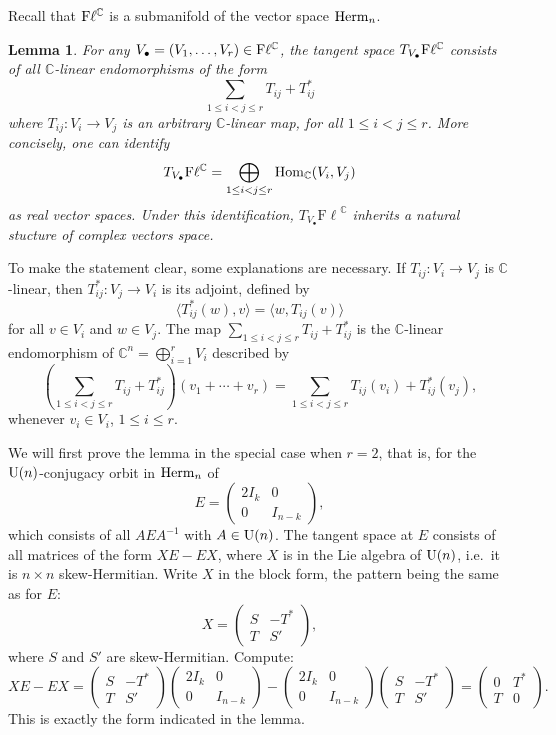 \documentclass[12pt]{amsart}
\newtheorem{lem}[thm]{Lemma}
\theoremstyle{definition}
\theoremstyle{remark}
\newcommand{\CC}{\mathbb C}
\newcommand{\Fl}{{\mathrm{F\ell}}}
\begin{document}
Recall that ${\rm F}\ell^\CC$ is a submanifold of the  vector space ${\rm Herm}_n$. 
\begin{lem} \label{tangsp} For any $V_{\bullet}= (V_1, \ldots, V_r)\in {\rm F}\ell^\CC$, the tangent space  $T_{V_{\bullet}}{\rm F}\ell^\CC$ consists of all $\CC$-linear endomorphisms of the form
$$\sum_{1\le i <j \le r} T_{ij}+T_{ij}^*$$
where $T_{ij} : V_i \to V_j$ is an arbitrary $\CC$-linear map, for all $1\le i < j \le r$.  More concisely, one can identify 
\begin{equation}\label{eq:tangent}T_{V_\bullet} {\rm F}\ell^\CC =\bigoplus_{1\le i < j \le r} {\rm Hom}_\CC (V_i, V_j)\end{equation}
as real vector spaces. Under this identification, $T_{V_\bullet}\Fl^\CC$ inherits a natural stucture of complex vectors space. 
\end{lem}
To make the statement clear, some explanations are necessary. If $T_{ij} : V_i \to V_j$ is
$\CC$-linear, then $T_{ij}^*: V_j \to V_i$ is its adjoint, defined by
$$\langle T_{ij}^*(w), v\rangle = \langle w, T_{ij}(v)\rangle $$
for all $v\in V_i$ and $w\in V_j$. The map 
$\sum_{1\le i <j \le r} T_{ij}+T_{ij}^*$ is the $\CC$-linear endomorphism of $\CC^n=\bigoplus_{i=1}^r V_i$ described by
$$\left(\sum_{1\le i <j \le r} T_{ij}+T_{ij}^*\right)(v_1+ \cdots + v_r) =\sum_{1\le i <j \le r}
T_{ij}(v_i) + T_{ij}^*(v_j),$$
whenever $v_i \in V_i$, $1\le i \le r$. 

We will first prove the lemma in the special case when $r=2$, that is, for the ${\rm U}(n)$-conjugacy orbit in ${\rm Herm}_n$ of 
$$E= \begin{pmatrix}
2I_k& 0\\
0 &I_{n-k}
\end{pmatrix}, $$
which consists of all $AEA^{-1}$ with $A\in {\rm U}(n)$. 
The tangent space at $E$ consists of all matrices of the form $XE - EX$, where $X$ is in the Lie algebra of ${\rm U}(n)$, i.e.~it is $n\times n$ skew-Hermitian. 
Write $X$ in the block form, the pattern being the same as for $E$:
$$X=\begin{pmatrix}
S& -T^*\\
T &S'
\end{pmatrix},$$
where $S$ and $S'$ are skew-Hermitian. Compute:
$$XE-EX= 
\begin{pmatrix}
S& -T^*\\
T &S'
\end{pmatrix} \begin{pmatrix}
2I_k& 0\\
0 &I_{n-k}
\end{pmatrix} - \begin{pmatrix}
2I_k& 0\\
0&I_{n-k}
\end{pmatrix} \begin{pmatrix}
S& -T^*\\
T &S'
\end{pmatrix}=\begin{pmatrix}
0& T^*\\
T &0
\end{pmatrix}.
$$
This is exactly the form indicated in the lemma.
\end{document}
